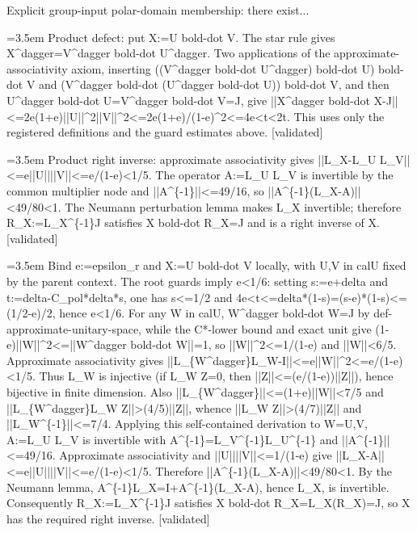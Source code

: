 \documentclass{article}
\newcommand{\step}[1]{\par\noindent\hangindent=3.5em\hangafter=1%
  \makebox[3.5em][l]{\textbf{#1.}}}
\newcommand{\steptag}[1]{\hfill{\small\textsf{[#1]}}}
\begin{document}
\begin{proofbox}{Explicit group-input polar-domain membership: there exist...}
\step{1.5} Product defect: put X:=U bold-dot V. The star rule gives X\textasciicircum{}dagger=V\textasciicircum{}dagger bold-dot U\textasciicircum{}dagger. Two applications of the approximate-associativity axiom, inserting ((V\textasciicircum{}dagger bold-dot U\textasciicircum{}dagger) bold-dot U) bold-dot V and (V\textasciicircum{}dagger bold-dot (U\textasciicircum{}dagger bold-dot U)) bold-dot V, and then U\textasciicircum{}dagger bold-dot U=V\textasciicircum{}dagger bold-dot V=J, give ||X\textasciicircum{}dagger bold-dot X-J||<=2e(1+e)||U||\textasciicircum{}2||V||\textasciicircum{}2<=2e(1+e)/(1-e)\textasciicircum{}2<=4e<t<2t. This uses only the registered definitions and the guard estimates above. \steptag{validated} \\[4pt]
\step{1.6} Product right inverse: approximate associativity gives ||L\_X-L\_U L\_V||<=e||U||||V||<=e/(1-e)<1/5. The operator A:=L\_U L\_V is invertible by the common multiplier node and ||A\textasciicircum{}\{-1\}||<=49/16, so ||A\textasciicircum{}\{-1\}(L\_X-A)||<49/80<1. The Neumann perturbation lemma makes L\_X invertible; therefore R\_X:=L\_X\textasciicircum{}\{-1\}J satisfies X bold-dot R\_X=J and is a right inverse of X. \steptag{validated} \\[6pt]
\step{1.6.1} Bind e:=epsilon\_r and X:=U bold-dot V locally, with U,V in calU fixed by the parent context. The root guards imply e<1/6: setting s:=e+delta and t:=delta-C\_pol*delta*s, one has s<=1/2 and 4e<t<=delta*(1-s)=(s-e)*(1-s)<=(1/2-e)/2, hence e<1/6. For any W in calU, W\textasciicircum{}dagger bold-dot W=J by def-approximate-unitary-space, while the C*-lower bound and exact unit give (1-e)||W||\textasciicircum{}2<=||W\textasciicircum{}dagger bold-dot W||=1, so ||W||\textasciicircum{}2<=1/(1-e) and ||W||<6/5. Approximate associativity gives ||L\_\{W\textasciicircum{}dagger\}L\_W-I||<=e||W||\textasciicircum{}2<=e/(1-e)<1/5. Thus L\_W is injective (if L\_W Z=0, then ||Z||<=(e/(1-e))||Z||), hence bijective in finite dimension. Also ||L\_\{W\textasciicircum{}dagger\}||<=(1+e)||W||<7/5 and ||L\_\{W\textasciicircum{}dagger\}L\_W Z||>(4/5)||Z||, whence ||L\_W Z||>(4/7)||Z|| and ||L\_W\textasciicircum{}\{-1\}||<=7/4. Applying this self-contained derivation to W=U,V, A:=L\_U L\_V is invertible with A\textasciicircum{}\{-1\}=L\_V\textasciicircum{}\{-1\}L\_U\textasciicircum{}\{-1\} and ||A\textasciicircum{}\{-1\}||<=49/16. Approximate associativity and ||U||||V||<=1/(1-e) give ||L\_X-A||<=e||U||||V||<=e/(1-e)<1/5. Therefore ||A\textasciicircum{}\{-1\}(L\_X-A)||<49/80<1. By the Neumann lemma, A\textasciicircum{}\{-1\}L\_X=I+A\textasciicircum{}\{-1\}(L\_X-A), hence L\_X, is invertible. Consequently R\_X:=L\_X\textasciicircum{}\{-1\}J satisfies X bold-dot R\_X=L\_X(R\_X)=J, so X has the required right inverse. \steptag{validated} \\[4pt]

\end{proofbox}
\end{document}
